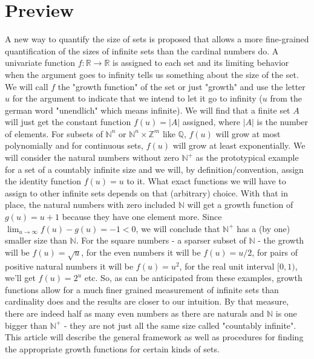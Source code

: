 \documentclass[12pt]{article}
\begin{document}
\section{Preview}
A new way to quantify the size of sets is proposed that allows a more fine-grained quantification of the sizes of infinite sets than the cardinal numbers do. A univariate function $f: \mathbb{R} \rightarrow \mathbb{R}$ is assigned to each set and its limiting behavior when the argument goes to infinity tells us something about the size of the set. We will call $f$ the "growth function" of the set or just "growth" and use the letter $u$ for the argument to indicate that we intend to let it go to infinity ($u$ from the german word "unendlich" which means infinite). We will find that a finite set $A$ will just get the constant function $f(u) = |A|$ assigned, where $|A|$ is the number of elements. For subsets of $\mathbb{N}^n$ or $\mathbb{N}^n \times \mathbb{Z}^m$  like $\mathbb{Q}$, $f(u)$ will grow at most polynomially and for continuous sets, $f(u)$ will grow at least exponentially. We will consider the natural numbers without zero $\mathbb{N}^+$ as the prototypical example for a set of a countably infinite size and we will, by definition/convention, assign the identity function $f(u) = u$ to it. What exact functions we will have to assign to other infinite sets depends on that (arbitrary) choice. With that in place, the natural numbers with zero included $\mathbb{N}$ will get a growth function of $g(u) = u + 1$ because they have one element more. Since $\lim_{u \rightarrow \infty} f(u) - g(u) = -1 < 0$, we will conclude that $\mathbb{N}^+$ has a (by one) smaller size than $\mathbb{N}$. For the square numbers - a sparser subset of $\mathbb{N}$ - the growth will be $f(u) = \sqrt{u}$, for the even numbers it will be $f(u) = u/2$, for pairs of positive natural numbers it will be $f(u) = u^2$, for the real unit interval $[0,1)$, we'll get $f(u) = 2^u$ etc. So, as can be anticipated from these examples, growth functions allow for a much finer grained measurement of infinite sets than cardinality does and the results are closer to our intuition. By that measure, there are indeed half as many even numbers as there are naturals and $\mathbb{N}$ is one bigger than $\mathbb{N}^+$ - they are not just all the same size called "countably infinite". This article will describe the general framework as well as procedures for finding the appropriate growth functions for certain kinds of sets.

\end{document}
